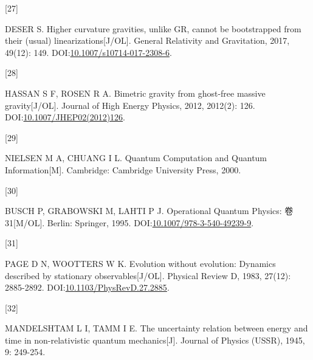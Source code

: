 \documentclass[
  chinese,
  a4paper,
  UTF8,
  12pt,
  oneside,
  openany]{ctexbook}
\newlength{\cslhangindent}
\newlength{\csllabelwidth}
\newenvironment{CSLReferences}[2] %
 {\begin{list}{}{%
  \setlength{\itemindent}{0pt}
  \setlength{\leftmargin}{0pt}
  \setlength{\parsep}{0pt}
  \ifodd #1
   \setlength{\leftmargin}{\cslhangindent}
   \setlength{\itemindent}{-1\cslhangindent}
  \fi
  \setlength{\itemsep}{#2\baselineskip}}}
 {\end{list}}
\newcommand{\CSLLeftMargin}[1]{\parbox[t]{\csllabelwidth}{\strut#1\strut}}
\newcommand{\CSLRightInline}[1]{\parbox[t]{\linewidth - \csllabelwidth}{\strut#1\strut}}
\theoremstyle{plain}
\theoremstyle{plain}
\theoremstyle{plain}
\theoremstyle{definition}
\theoremstyle{plain}
\theoremstyle{plain}
\theoremstyle{remark}
\begin{document}
\begin{CSLReferences}{0}{0}
\CSLLeftMargin{{[}27{]} }%
\CSLRightInline{DESER S. Higher curvature gravities, unlike GR, cannot
be bootstrapped from their (usual) linearizations{[}J/OL{]}. General
Relativity and Gravitation, 2017, 49(12): 149.
DOI:\href{https://doi.org/10.1007/s10714-017-2308-6}{10.1007/s10714-017-2308-6}.}

\CSLLeftMargin{{[}28{]} }%
\CSLRightInline{HASSAN S F, ROSEN R A. Bimetric gravity from ghost-free
massive gravity{[}J/OL{]}. Journal of High Energy Physics, 2012,
2012(2): 126.
DOI:\href{https://doi.org/10.1007/JHEP02(2012)126}{10.1007/JHEP02(2012)126}.}

\CSLLeftMargin{{[}29{]} }%
\CSLRightInline{NIELSEN M A, CHUANG I L. Quantum Computation and Quantum
Information{[}M{]}. Cambridge: Cambridge University Press, 2000.}

\CSLLeftMargin{{[}30{]} }%
\CSLRightInline{BUSCH P, GRABOWSKI M, LAHTI P J. Operational Quantum
Physics: 卷 31{[}M/OL{]}. Berlin: Springer, 1995.
DOI:\href{https://doi.org/10.1007/978-3-540-49239-9}{10.1007/978-3-540-49239-9}.}

\CSLLeftMargin{{[}31{]} }%
\CSLRightInline{PAGE D N, WOOTTERS W K. Evolution without evolution:
Dynamics described by stationary observables{[}J/OL{]}. Physical Review
D, 1983, 27(12): 2885-2892.
DOI:\href{https://doi.org/10.1103/PhysRevD.27.2885}{10.1103/PhysRevD.27.2885}.}

\CSLLeftMargin{{[}32{]} }%
\CSLRightInline{MANDELSHTAM L I, TAMM I E. The uncertainty relation
between energy and time in non-relativistic quantum mechanics{[}J{]}.
Journal of Physics (USSR), 1945, 9: 249-254.}

\end{CSLReferences}


\backmatter
\end{document}
